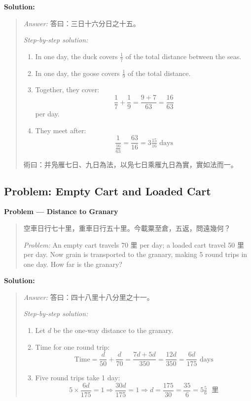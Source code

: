 \documentclass[11pt,a4paper]{article}
\newcommand{\zh}[1]{{#1}}
\newenvironment{chproblem}[1][]{%
  \par\medskip\noindent\textbf{\textcolor{sectioncolor}{#1}}\par\nopagebreak
  \begin{quote}\small
}{%
  \end{quote}\medskip
}
\newenvironment{chsolution}{%
  \par\medskip\noindent\textbf{\textcolor{notecolor}{Solution:}}\par\nopagebreak
  \begin{quote}\small
}{%
  \end{quote}\medskip
}
\newenvironment{stepbystep}{%
  \par\smallskip\noindent\textit{Step-by-step solution:}\par\nopagebreak
  \begin{enumerate}[leftmargin=2em,label=\textbf{Step \arabic*:},ref=\arabic*]
}{%
  \end{enumerate}\medskip
}
\begin{document}
\begin{chsolution}
\textit{Answer:} \zh{答曰：三日十六分日之十五。}

\begin{stepbystep}
\item In one day, the duck covers $\frac{1}{7}$ of the total distance between
the seas.

\item In one day, the goose covers $\frac{1}{9}$ of the total distance.

\item Together, they cover:
\[
\frac{1}{7} + \frac{1}{9} = \frac{9 + 7}{63} = \frac{16}{63}
\]
per day.

\item They meet after:
\[
\frac{1}{\frac{16}{63}} = \frac{63}{16} = 3\tfrac{15}{16} \text{ days}
\]
\end{stepbystep}

\zh{術曰：并凫雁七日、九日為法，以凫七日乘雁九日為實，實如法而一。}
\end{chsolution}

\subsection{Problem: Empty Cart and Loaded Cart}

\begin{chproblem}[Problem --- Distance to Granary]
\zh{空車日行七十里，重車日行五十里。今載粟至倉，五返，問遠幾何？}

\medskip
\textit{Problem:} An empty cart travels 70 \zh{里} per day; a loaded cart
travel 50 \zh{里} per day. Now grain is transported to the granary, making 5
round trips in one day. How far is the granary?
\end{chproblem}

\begin{chsolution}
\textit{Answer:} \zh{答曰：四十八里十八分里之十一。}

\begin{stepbystep}
\item Let $d$ be the one-way distance to the granary.

\item Time for one round trip:
\[
\text{Time} = \frac{d}{50} + \frac{d}{70} = \frac{7d + 5d}{350} = \frac{12d}{350} = \frac{6d}{175} \text{ days}
\]

\item Five round trips take 1 day:
\[
5 \times \frac{6d}{175} = 1 \Rightarrow \frac{30d}{175} = 1 \Rightarrow d = \frac{175}{30} = \frac{35}{6} = 5\tfrac{5}{6} \text{ \zh{里}}
\]
\end{stepbystep}
\end{chsolution}
\end{document}
